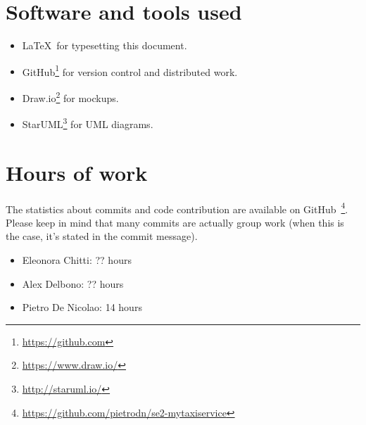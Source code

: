 \section{Software and tools used}
\begin{itemize}
    \item \LaTeX\, for typesetting this document.
    \item GitHub\footnote{\url{https://github.com}} for version control and distributed work.
    \item Draw.io\footnote{\url{https://www.draw.io/}} for mockups.
    \item StarUML\footnote{\url{http://staruml.io/}} for UML diagrams.
\end{itemize}

\section{Hours of work}
The statistics about commits and code contribution are available on GitHub~\footnote{\url{https://github.com/pietrodn/se2-mytaxiservice}}.
Please keep in mind that many commits are actually group work (when this is the case, it's stated in the commit message).

\begin{itemize}
    \item Eleonora Chitti: ?? hours
    \item Alex Delbono: ?? hours
    \item Pietro De Nicolao: 14 hours
\end{itemize}
